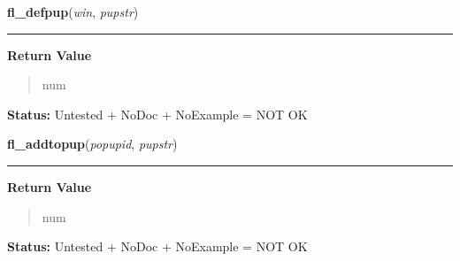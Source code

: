     \label{xformslib:library:fl_defpup}

    \vspace{0.5ex}

\hspace{.8\funcindent}\begin{boxedminipage}{\funcwidth}

    \raggedright \textbf{fl\_defpup}(\textit{win}, \textit{pupstr})

    \vspace{-1.5ex}

    \rule{\textwidth}{0.5\fboxrule}
\setlength{\parskip}{2ex}
\setlength{\parskip}{1ex}
      \textbf{Return Value}
    \vspace{-1ex}

      \begin{quote}
      num

      \end{quote}

\textbf{Status:} Untested + NoDoc + NoExample = NOT OK



    \end{boxedminipage}

    \label{xformslib:library:fl_addtopup}

    \vspace{0.5ex}

\hspace{.8\funcindent}\begin{boxedminipage}{\funcwidth}

    \raggedright \textbf{fl\_addtopup}(\textit{popupid}, \textit{pupstr})

    \vspace{-1.5ex}

    \rule{\textwidth}{0.5\fboxrule}
\setlength{\parskip}{2ex}
\setlength{\parskip}{1ex}
      \textbf{Return Value}
    \vspace{-1ex}

      \begin{quote}
      num

      \end{quote}

\textbf{Status:} Untested + NoDoc + NoExample = NOT OK



    \end{boxedminipage}

